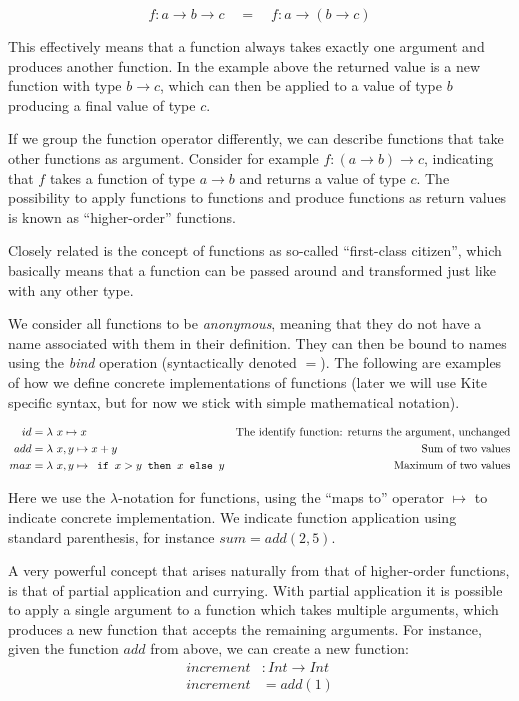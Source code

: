\[ f: a \to b \to c \quad = \quad f: a \to (b \to c) \]

This effectively means that a function always takes exactly one argument and produces another function. In the example above the returned value is a new function with type $b \to c$, which can then be applied to a value of type $b$ producing a final value of type $c$.

If we group the function operator differently, we can describe functions that take other functions as argument. Consider for example $f: (a \to b) \to c$, indicating that $f$ takes a function of type $a \to b$ and returns a value of type $c$. The possibility to apply functions to functions and produce functions as return values is known as ``higher-order'' functions.

Closely related is the concept of functions as so-called ``first-class citizen'', which basically means that a function can be passed around and transformed just like with any other type.

We consider all functions to be \emph{anonymous}, meaning that they do not have a name associated with them in their definition. They can then be bound to names using the \emph{bind} operation (syntactically denoted $=$). The following are examples of how we define concrete implementations of functions (later we will use Kite specific syntax, but for now we stick with simple mathematical notation).

\begin{align*}
id &= \lambda{} \ x \mapsto{} x & \text{The identify function: returns the argument, unchanged}\\
add &= \lambda{} \  x, y  \mapsto{}  x + y   & \text{Sum of two values}\\
max &= \lambda{} \  x, y  \mapsto{}  \texttt{ if } x > y \texttt{ then } x \texttt{ else } y   & \text{Maximum of two values}\\
\end{align*}

Here we use the $\lambda$-notation for functions, using the ``maps to'' operator $\mapsto$ to indicate concrete implementation. We indicate function application using standard parenthesis, for instance $sum = add(2, 5)$.

A very powerful concept that arises naturally from that of higher-order functions, is that of partial application and currying. With partial application it is possible to apply a single argument to a function which takes multiple arguments, which produces a new function that accepts the remaining arguments. For instance, given the function $add$ from above, we can create a new function:
\begin{align*}
increment &: Int \to Int\\
increment &= add(1)
\end{align*}

